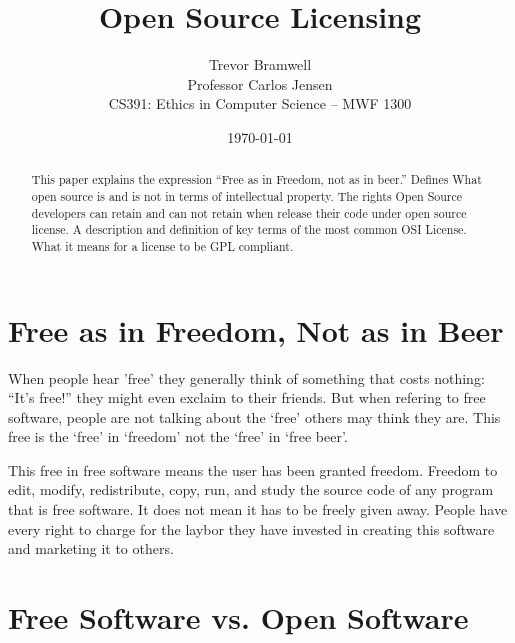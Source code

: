 \documentclass[12pt,letterpaper]{article}
\title{Open Source Licensing}
\author{
    Trevor Bramwell\\
    Professor Carlos Jensen\\
    CS391: Ethics in Computer Science -- MWF 1300\\
}
\date{\today}
\begin{document}
\maketitle

\begin{abstract}
This paper explains the expression ``Free as in Freedom, not as in
beer.'' Defines What open source is and is not in terms of intellectual 
property. The rights Open Source developers can retain and can not
retain when release their code under open source license. A description
and definition of key terms of the most common OSI License. What it
means for a license to be GPL compliant.
\end{abstract}

\section{Free as in Freedom, Not as in Beer}
When people hear 'free' they generally think of something that costs
nothing: ``It's free!'' they might even exclaim to their friends. But
when refering to free software, people are not talking about the `free'
others may think they are. This free is the `free' in `freedom' not
the `free' in `free beer'.

This free in free software means the user has been granted freedom.
Freedom to edit, modify, redistribute, copy, run, and study the source
code of any program that is free software. It does not mean it has to be
freely given away. People have every right to charge for the laybor they
have invested in creating this software and marketing it to others.

\section{Free Software vs. Open Software}



\pagebreak

\end{document}
